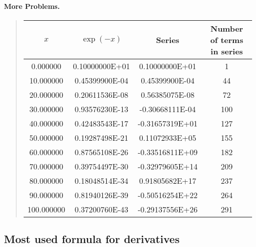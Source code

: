 \documentclass[%
twoside,                 %
final,                   %
10pt]{article}
\newenvironment{paragraphadmon}[1][]{\paragraph{#1}}{}
\begin{document}
\begin{paragraphadmon}[More Problems.]


\begin{quote}
\begin{tabular}{cccc}
\hline
\multicolumn{1}{c}{ $x$ } & \multicolumn{1}{c}{ $\exp{(-x)}$ } & \multicolumn{1}{c}{ Series } & \multicolumn{1}{c}{ Number of terms in series } \\
\hline
0.000000                  & 0.10000000E+01            & 0.10000000E+01            & 1                         \\
10.000000                 & 0.45399900E-04            & 0.45399900E-04            & 44                        \\
20.000000                 & 0.20611536E-08            & 0.56385075E-08            & 72                        \\
30.000000                 & 0.93576230E-13            & -0.30668111E-04           & 100                       \\
40.000000                 & 0.42483543E-17            & -0.31657319E+01           & 127                       \\
50.000000                 & 0.19287498E-21            & 0.11072933E+05            & 155                       \\
60.000000                 & 0.87565108E-26            & -0.33516811E+09           & 182                       \\
70.000000                 & 0.39754497E-30            & -0.32979605E+14           & 209                       \\
80.000000                 & 0.18048514E-34            & 0.91805682E+17            & 237                       \\
90.000000                 & 0.81940126E-39            & -0.50516254E+22           & 264                       \\
100.000000                & 0.37200760E-43            & -0.29137556E+26           & 291                       \\
\hline
\end{tabular}
\end{quote}

\noindent
\end{paragraphadmon}



\subsection{Most used formula for derivatives}
\end{document}

